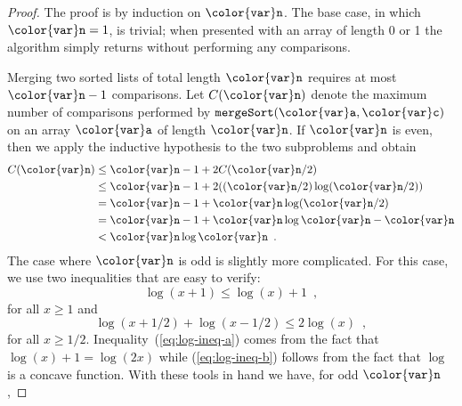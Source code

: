 \documentclass[10pt]{book}
\newcommand{\eqlabel}[1]{\label{eq:#1}}
\newcommand{\myeqref}[1]{(\ref{eq:#1})}
\theoremstyle{plain}
\theoremstyle{definition}
\begin{document}
\begin{proof}
The proof is by induction on $\ensuremath{\mathtt{{\color{var}n}}}$.  The base case, in which $\ensuremath{\mathtt{{\color{var}n}}}=1$,
is trivial; when presented with an array of length 0 or 1 the algorithm
simply returns without performing any comparisons.

Merging two sorted lists of total length $\ensuremath{\mathtt{{\color{var}n}}}$ requires at most $\ensuremath{\mathtt{{\color{var}n}}}-1$
comparisons. Let $C(\ensuremath{\mathtt{{\color{var}n}}})$ denote the maximum number of comparisons performed by
\ensuremath{\mathtt{mergeSort({\color{var}a},{\color{var}c})}} on an array \ensuremath{\mathtt{{\color{var}a}}} of length \ensuremath{\mathtt{{\color{var}n}}}.  If $\ensuremath{\mathtt{{\color{var}n}}}$ is even, then we apply the inductive hypothesis to
the two subproblems and obtain
\begin{align*}
  C(\ensuremath{\mathtt{{\color{var}n}}}) 
  &\le \ensuremath{\mathtt{{\color{var}n}}}-1 + 2C(\ensuremath{\mathtt{{\color{var}n}}}/2) \\
  &\le \ensuremath{\mathtt{{\color{var}n}}}-1 + 2((\ensuremath{\mathtt{{\color{var}n}}}/2)\log(\ensuremath{\mathtt{{\color{var}n}}}/2)) \\
  &= \ensuremath{\mathtt{{\color{var}n}}}-1 + \ensuremath{\mathtt{{\color{var}n}}}\log(\ensuremath{\mathtt{{\color{var}n}}}/2) \\
  &= \ensuremath{\mathtt{{\color{var}n}}}-1 + \ensuremath{\mathtt{{\color{var}n}}}\log \ensuremath{\mathtt{{\color{var}n}}}-\ensuremath{\mathtt{{\color{var}n}}} \\
  &< \ensuremath{\mathtt{{\color{var}n}}}\log \ensuremath{\mathtt{{\color{var}n}}} \enspace .
\end{align*}
The case where $\ensuremath{\mathtt{{\color{var}n}}}$ is odd is slightly more complicated.  For this case,
we use two inequalities that are easy to verify:
\begin{equation}
  \log(x+1) \le \log(x) + 1 \enspace , \eqlabel{log-ineq-a}
\end{equation}
for all $x\ge 1$ and
\begin{equation}
  \log(x+1/2) + \log(x-1/2) \le 2\log(x) \enspace , \eqlabel{log-ineq-b}
\end{equation}
for all $x\ge 1/2$.  Inequality~\myeqref{log-ineq-a} comes from the fact that $\log(x)+1 = \log(2x)$ while \myeqref{log-ineq-b} follows from the fact that $\log$ is a concave function.  With these tools in hand we have, for odd \ensuremath{\mathtt{{\color{var}n}}},

\end{proof}
\end{document}
